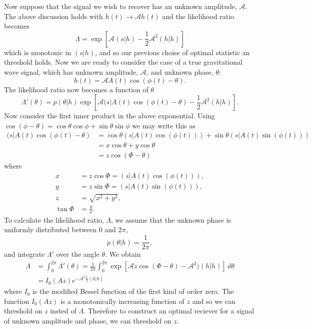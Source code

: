 Now suppose that the signal we wish to recover has an unknown amplitude,
$\mathcal{A}$. The above discussion holds with $h(t) \rightarrow
\mathcal{A}h(t)$ and the likelihood ratio becomes
\begin{equation}
\Lambda = \exp\left[\mathcal{A}(s|h) - \frac{1}{2}\mathcal{A}^2(h|h)\right]
\end{equation}
which is monotonic in $(s|h)$, and so our previous choise of optimal statistic
an threshold holds. Now we are ready to consider the case of a true
gravitational wave signal, which has unknown amplitude, $\mathcal{A}$, and
unknown phase, $\theta$:
\begin{equation}
h(t) = \mathcal{A} A(t) \cos(\phi(t) - \theta).
\end{equation}
The likelihood ratio now becomes a function of $\theta$
\begin{equation}
\Lambda'(\theta) = 
p(\theta|h) \exp\left[\mathcal{A}(s|A(t)\cos(\phi(t) - \theta) -
\frac{1}{2}\mathcal{A}^2(h|h)\right].
\end{equation}
Now consider the first inner product in the above exponential. Using
$\cos(\phi - \theta) = \cos\theta\cos\phi + \sin\theta\sin\phi$ we may write
this as
\begin{equation}
\begin{split}
(s|A(t)\cos(\phi(t) - \theta)  &= 
\cos\theta (s|A(t)\cos(\phi(t))) + \sin\theta (s|A(t)\sin(\phi(t)))  \\
& = x\cos\theta + y\cos\theta \\
& = z\cos(\Phi - \theta)
\end{split}
\end{equation}
where
\begin{align}
x &= z\cos\Phi = (s|A(t)\cos(\phi(t))), \\
y &= z\sin\Phi = (s|A(t)\sin(\phi(t))), \\
z &= \sqrt{x^2 + y^2}, \\
\tan \Phi &= \frac{y}{x}.
\end{align}
To calculate the likelihood ratio, $\Lambda$, we assume that the unknown phase
is uniformly distributed between $0$ and $2\pi$,
\begin{equation}
p(\theta|h) = \frac{1}{2\pi},
\end{equation}
and integrate $\Lambda'$ over the angle $\theta$. We obtain
\begin{equation}
\begin{split}
\Lambda &= \int_0^{2\pi} \Lambda'(\theta) 
= \frac{1}{2\pi}\int_0^{2\pi}\exp\left[\mathcal{A}z\cos(\Phi - \theta) -
\mathcal{A}^2)(h|h)\right] \,d\theta \\
&= I_0(Az) e^{-\mathcal{A}^2\frac{1}{2}(h|h)}
\end{split}
\end{equation}
where $I_0$ is the modified Bessel function of the first kind of order zero.
The function $I_0(Az)$ is a monotonically increasing function of $z$ and so we
can threshold on $z$ insted of $\Lambda$. Therefore to construct an optimal
reciever for a signal of unknown amplitude and phase, we can threshold on $z$.

